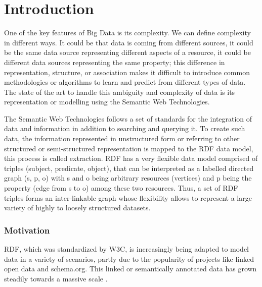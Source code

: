 \chapter{Introduction}
\label{chapter:intro}
One of the key features of Big Data is its complexity. 
We can define complexity in different ways.
It could be that data is coming from different sources, it could be the same data source representing different aspects of a resource, it could be different data sources representing the same property; this difference in representation, structure, or association makes it difficult to introduce common methodologies or algorithms to learn and predict from different types of data. 
The state of the art to handle this ambiguity and complexity of data is its representation or modelling using the Semantic Web Technologies.

The Semantic Web Technologies follows a set of standards for the integration of data and information in addition to searching and querying it. 
To create such data, the information represented in unstructured form or referring to other structured or semi-structured representation is mapped to the \gls{RDF} data model, this process is called extraction. 
\gls{RDF} has a very flexible data model comprised of triples (subject, predicate, object), that can be interpreted as a labelled directed graph (s, p, o) with s and o being arbitrary resources (vertices) and p being the property (edge from s to o) among these two resources. 
Thus, a set of \gls{RDF} triples forms an inter-linkable graph whose flexibility allows to represent a large variety of highly to loosely structured datasets. 

\subsection{Motivation}
\label{sec:motivation}
RDF, which was standardized by \gls{W3C}, is increasingly being adapted to model data in a variety of scenarios, partly due to the popularity of projects like linked open data and schema.org. 
This linked or semantically annotated data has grown steadily towards a massive scale .


